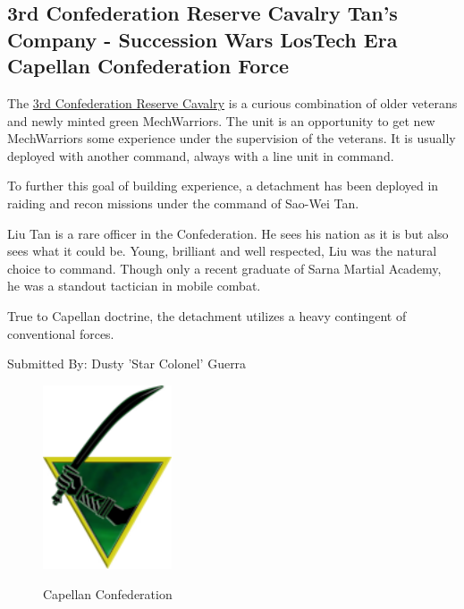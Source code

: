 \subsection{3rd Confederation Reserve Cavalry Tan's Company - Succession Wars LosTech Era Capellan Confederation Force}

The \href{https://www.sarna.net/wiki/3rd_Confederation_Reserve_Cavalry}{3rd Confederation Reserve Cavalry} is a curious combination of older veterans and newly minted green MechWarriors.
The unit is an opportunity to get new MechWarriors some experience under the supervision of the veterans.
It is usually deployed with another command, always with a line unit in command.

To further this goal of building experience, a detachment has been deployed in raiding and recon missions under the command of Sao-Wei Tan.

Liu Tan is a rare officer in the Confederation.
He sees his nation as it is but also sees what it could be.
Young, brilliant and well respected, Liu was the natural choice to command.
Though only a recent graduate of Sarna Martial Academy, he was a standout tactician in mobile combat.

True to Capellan doctrine, the detachment utilizes a heavy contingent of conventional forces.

Submitted By: Dusty 'Star Colonel' Guerra

\begin{figure}[!h]
  \centering
  \includegraphics[alt='Capellan Confederation Logo', width=1.5in, height=2.139in]{img/Capellan-Confederation.png}
  \caption*{Capellan Confederation}
\end{figure}

